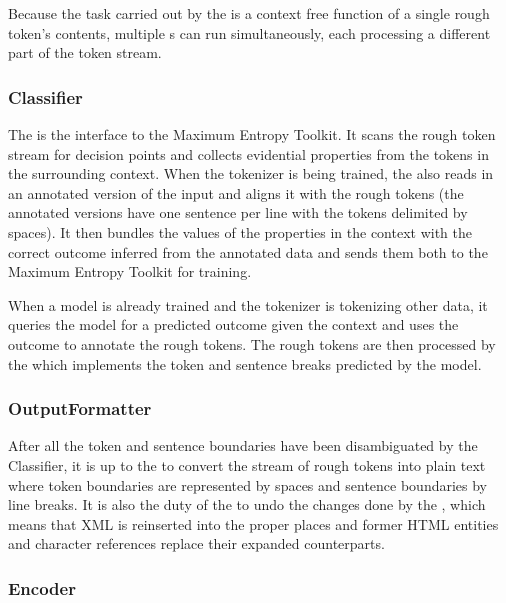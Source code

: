 Because the task carried out by the  is a context free
function of a single rough token's contents, multiple s
can run simultaneously, each processing a different part of the token stream.

\subsubsection{Classifier}
\label{ssec:impl-overview-classifier}

The  is the interface to the Maximum Entropy Toolkit. It
scans the rough token stream for decision points and collects evidential
properties from the tokens in the surrounding context. When the tokenizer is
being trained, the  also reads in an annotated version of the
input and aligns it with the rough tokens (the annotated versions have one
sentence per line with the tokens delimited by spaces). It then bundles the
values of the properties in the context with the correct outcome inferred from
the annotated data and sends them both to the Maximum Entropy Toolkit for
training.

When a model is already trained and the tokenizer is tokenizing other data, it
queries the model for a predicted outcome given the context and uses the
outcome to annotate the rough tokens. The rough tokens are then processed by
the  which implements the token and sentence breaks
predicted by the model.

\subsubsection{OutputFormatter}
\label{ssec:impl-overview-outputformatter}

After all the token and sentence boundaries have been disambiguated by the
Classifier, it is up to the  to convert the stream of
rough tokens into plain text where token boundaries are represented by spaces
and sentence boundaries by line breaks. It is also the duty of the
 to undo the changes done by the ,
which means that XML is reinserted into the proper places and former HTML
entities and character references replace their expanded counterparts.

\subsubsection{Encoder}
\label{ssec:impl-overview-encoder}

